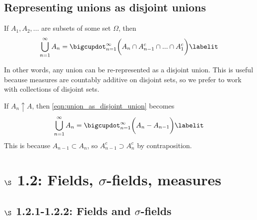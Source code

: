 \documentclass{article} %
\newcommand{\sfs}{$\sigma$-fields}
\begin{document}
\subsection{Representing unions as disjoint unions} \label{sec:representing_unions_as_disjoint_unions}
 
\begin{remark}
If $A_1,A_2,...$ are subsets of some set $\Omega$, then
\begin{align*} 
\bigcup_{n=1}^\infty A_n = \bigcupdot_{n=1}^\infty \bigg(A_n \cap A_{n-1}^c \cap ... \cap A_1^c \bigg) 	
\labelit \label{eqn:union_as_disjoint_union}
\end{align*}

In other words, any union can be re-represented as a disjoint union. This is useful because measures are countably additive on disjoint sets, so we prefer to work with collections of disjoint sets.
\label{rk:rerepresenting_unions_as_disjoint_unions}
\end{remark}

\begin{remark}
If $A_n \uparrow A$, then \eqref{eqn:union_as_disjoint_union} becomes
\begin{align*}
	\bigcup_{n=1}^\infty A_n = \bigcupdot_{n=1}^\infty \bigg( A_n - A_{n-1} \bigg) 
\labelit \label{eqn:union_as_disjoint_union_for_increasing_sequences}
\end{align*}
This is because $A_{n-1} \subset A_{n}$, so $A_{n-1}^c \supset A_{n}^c$ by contraposition.	
\end{remark}

\section{$\S$ 1.2: Fields, \sfs, measures}

\subsection{$\S$ 1.2.1-1.2.2: Fields and \sfs}
\end{document}
